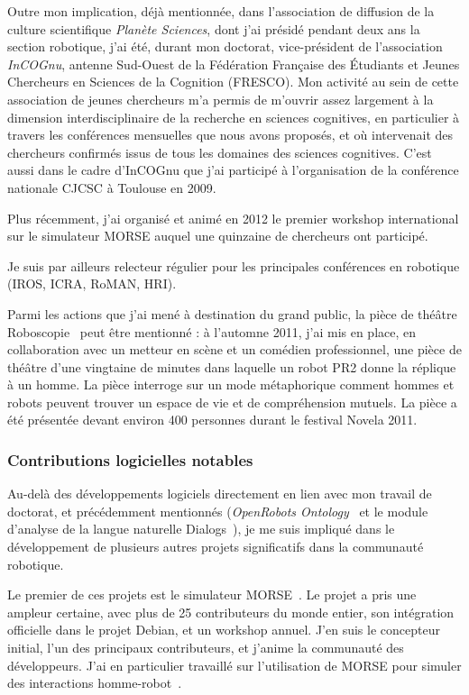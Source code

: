 \documentclass[a4paper]{article}
\begin{document}
Outre mon implication, déjà mentionnée, dans l'association de diffusion de la
culture scientifique \emph{Planète Sciences}, dont j'ai présidé pendant deux ans
la section robotique, j'ai été, durant mon doctorat, vice-président de
l'association \emph{InCOGnu}, antenne Sud-Ouest de la Fédération Française des
Étudiants et Jeunes Chercheurs en Sciences de la Cognition (FRESCO). Mon
activité au sein de cette association de jeunes chercheurs m'a permis de
m'ouvrir assez largement à la dimension interdisciplinaire de la recherche en
sciences cognitives, en particulier à travers les conférences mensuelles que
nous avons proposés, et où intervenait des chercheurs confirmés issus de tous
les domaines des sciences cognitives.  C'est aussi dans le cadre d'InCOGnu que
j'ai participé à l'organisation de la conférence nationale CJCSC à Toulouse en 2009.

Plus récemment, j'ai organisé et animé en 2012 le premier workshop international
sur le simulateur MORSE auquel une quinzaine de chercheurs ont participé.

Je suis par ailleurs relecteur régulier pour les principales conférences en
robotique (IROS, ICRA, RoMAN, HRI).

Parmi les actions que j'ai mené à destination du grand public, la pièce de
théâtre Roboscopie~\cite{lemaignan2012roboscopie} peut être mentionné : à l'automne
2011, j'ai mis en place, en collaboration avec un metteur en scène et un
comédien professionnel, une pièce de théâtre d'une vingtaine de minutes dans
laquelle un robot PR2 donne la réplique à un homme. La pièce interroge sur un
mode métaphorique comment hommes et robots peuvent trouver un espace de vie et
de compréhension mutuels. La pièce a été présentée devant environ 400 personnes
durant le festival Novela 2011.

\subsubsection{Contributions logicielles notables}

Au-delà des développements logiciels directement en lien avec mon travail de
doctorat, et précédemment mentionnés (\emph{OpenRobots
Ontology}~\cite{Lemaignan2010} et le module d'analyse de la langue naturelle
{\sc Dialogs}~\cite{Lemaignan2011a}), je me suis impliqué dans le développement
de plusieurs autres projets significatifs dans la communauté robotique.

Le premier de ces projets est le simulateur MORSE~\cite{Echeverria2011,
echeverria2012simulating}. Le projet a pris une ampleur certaine, avec plus de
25 contributeurs du monde entier, son intégration officielle dans le projet
Debian, et un workshop annuel. J'en suis le concepteur initial, l'un des
principaux contributeurs, et j'anime la communauté des
développeurs. J'ai en particulier travaillé sur l'utilisation de MORSE pour
simuler des interactions homme-robot~\cite{lemaignan2012morse}.
\end{document}
